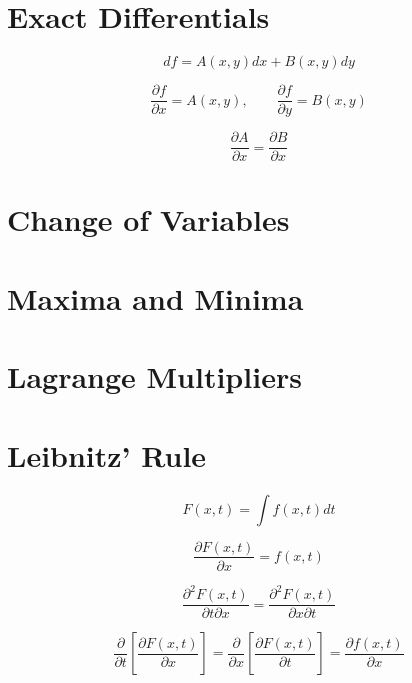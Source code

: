 \section{Exact Differentials}

\begin{equation*}
    df = A(x, y)dx + B(x, y)dy
\end{equation*}

\begin{equation*}
    \frac{\partial f}{\partial x} = A(x, y), \qquad \frac{\partial f}{\partial y} = B(x, y)
\end{equation*}

\begin{equation*}
    \frac{\partial A}{\partial x} = \frac{\partial B}{\partial x}
\end{equation*}

\section{Change of Variables}

\section{Maxima and Minima}

\section{Lagrange Multipliers}

\section{Leibnitz' Rule}

\begin{equation*}
    F(x,t) = \int f(x,t)dt
\end{equation*}

\begin{equation*}
    \frac{\partial F(x,t)}{\partial x} = f(x,t)
\end{equation*}

\begin{equation*}
    \frac{\partial^{2}F(x,t)}{\partial t \partial x} = \frac{\partial^{2}F(x,t)}{\partial x \partial t}
\end{equation*}

\begin{equation*}
    \frac{\partial}{\partial t}\left[\frac{\partial F(x,t)}{\partial x}\right] =
    \frac{\partial}{\partial x}\left[\frac{\partial F(x,t)}{\partial t}\right] =
    \frac{\partial f(x,t)}{\partial x}
\end{equation*}